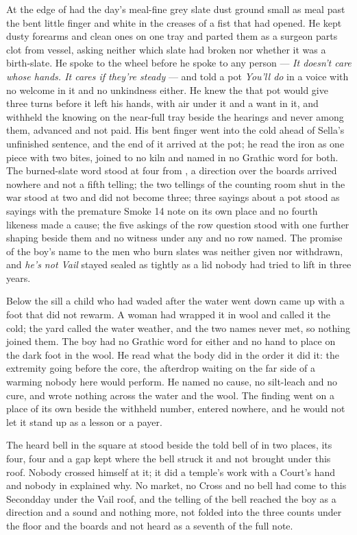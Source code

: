 At the edge of   had the day's meal-fine grey slate dust ground small as meal past the bent little finger and white in the creases of a fist that had opened. He kept dusty forearms and clean ones on one tray and parted them as a surgeon parts clot from vessel, asking neither which slate had broken nor whether it was a birth-slate. He spoke to the wheel before he spoke to any person --- \emph{It doesn't care whose hands. It cares if they're steady} --- and told a pot \emph{You'll do} in a voice with no welcome in it and no unkindness either. He knew the  that pot would give three turns before it left his hands, with air under it and a want in it, and withheld the knowing on the near-full tray beside the hearings and never among them, advanced and not paid. His bent finger went into the cold  ahead of Sella's unfinished sentence, and the end of it arrived at the pot; he read the iron as one piece with two bites, joined to no kiln and named in no Grathic word for both. The burned-slate word stood at four from , a direction over the boards arrived nowhere and not a fifth telling; the two tellings of the counting room shut in the war stood at two and did not become three; three sayings about a pot stood as sayings with the premature Smoke 14 note on its own place and no fourth likeness made a cause; the five askings of the row question stood with one further shaping beside them and no witness under any and no row named. The promise of the boy's name to the men who burn slates was neither given nor withdrawn, and \emph{he's not Vail} stayed sealed as tightly as a lid nobody had tried to lift in three years.

Below the sill a child who had waded after the water went down came up with a foot that did not rewarm. A woman had wrapped it in wool and called it the cold; the yard called the water weather, and the two names never met, so nothing joined them. The boy had no Grathic word for either and no hand to place on the dark foot in the wool. He read what the body did in the order it did it: the extremity going before the core, the afterdrop waiting on the far side of a warming nobody here would perform. He named no cause, no silt-leach and no cure, and wrote nothing across the water and the wool. The finding went on a place of its own beside the withheld number, entered nowhere, and he would not let it stand up as a lesson or a payer.

The heard bell in the square at  stood beside the told bell of  in two places, its four, four and a gap kept where the bell struck it and not brought under this roof. Nobody crossed himself at it; it did a temple's work with a Court's hand and nobody in  explained why. No market, no Cross and no bell had come to this Secondday under the Vail roof, and the telling of the bell reached the boy as a direction and a sound and nothing more, not folded into the three counts under the floor and the boards and not heard as a seventh of the full note.

